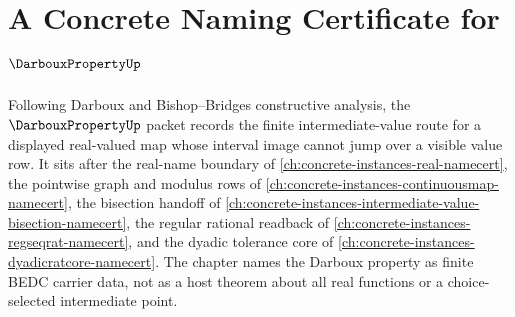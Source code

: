 \chapter{A Concrete Naming Certificate for $\DarbouxPropertyUp$}
\label{ch:concrete-instances-darboux-property-namecert}

Following Darboux and Bishop--Bridges constructive analysis, the $\DarbouxPropertyUp$ packet records the finite intermediate-value route for a displayed real-valued map whose interval image cannot jump over a visible value row. It sits after the real-name boundary of \autoref{ch:concrete-instances-real-namecert}, the pointwise graph and modulus rows of \autoref{ch:concrete-instances-continuousmap-namecert}, the bisection handoff of \autoref{ch:concrete-instances-intermediate-value-bisection-namecert}, the regular rational readback of \autoref{ch:concrete-instances-regseqrat-namecert}, and the dyadic tolerance core of \autoref{ch:concrete-instances-dyadicratcore-namecert}. The chapter names the Darboux property as finite BEDC carrier data, not as a host theorem about all real functions or a choice-selected intermediate point.

